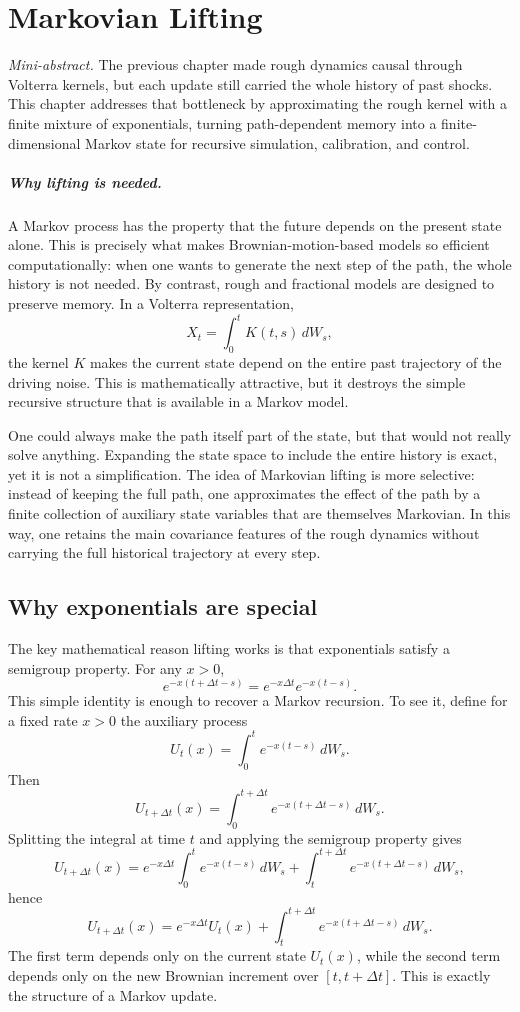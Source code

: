 \documentclass[a4paper,10pt,titlepage,oneside,openany]{book}
\theoremstyle{plain}
\theoremstyle{definition}
\theoremstyle{remark}
\newcommand{\miniabstract}[1]{%
\vspace{-2pt}
\begin{tcolorbox}[colback=gray!6,colframe=black!15,boxrule=0.3pt,arc=3pt,left=6pt,right=6pt,top=4pt,bottom=4pt]
\textit{Mini-abstract.} #1
\end{tcolorbox}
\vspace{-4pt}
}
\newcommand{\1}{\mathbf{1}}
\begin{document}
\chapter{Markovian Lifting}
\miniabstract{The previous chapter made rough dynamics causal through Volterra kernels, but each update still carried the whole history of past shocks. This chapter addresses that bottleneck by approximating the rough kernel with a finite mixture of exponentials, turning path-dependent memory into a finite-dimensional Markov state for recursive simulation, calibration, and control.}

\paragraph{Why lifting is needed.}

A Markov process has the property that the future depends on the present state alone. This is precisely what makes Brownian-motion-based models so efficient computationally: when one wants to generate the next step of the path, the whole history is not needed. By contrast, rough and fractional models are designed to preserve memory. In a Volterra representation,
\[
X_t=\int_0^t K(t,s)\,dW_s,
\]
the kernel \(K\) makes the current state depend on the entire past trajectory of the driving noise. This is mathematically attractive, but it destroys the simple recursive structure that is available in a Markov model.

One could always make the path itself part of the state, but that would not really solve anything. Expanding the state space to include the entire history is exact, yet it is not a simplification. The idea of Markovian lifting is more selective: instead of keeping the full path, one approximates the effect of the path by a finite collection of auxiliary state variables that are themselves Markovian. In this way, one retains the main covariance features of the rough dynamics without carrying the full historical trajectory at every step.

\section{Why exponentials are special}

The key mathematical reason lifting works is that exponentials satisfy a semigroup property. For any \(x>0\),
\[
e^{-x(t+\Delta t-s)} = e^{-x\Delta t}e^{-x(t-s)}.
\]
This simple identity is enough to recover a Markov recursion. To see it, define for a fixed rate \(x>0\) the auxiliary process
\[
U_t(x)=\int_0^t e^{-x(t-s)}\,dW_s.
\]
Then
\[
U_{t+\Delta t}(x)
=
\int_0^{t+\Delta t} e^{-x(t+\Delta t-s)}\,dW_s.
\]
Splitting the integral at time \(t\) and applying the semigroup property gives
\[
U_{t+\Delta t}(x)
=
e^{-x\Delta t}\int_0^t e^{-x(t-s)}\,dW_s
+
\int_t^{t+\Delta t} e^{-x(t+\Delta t-s)}\,dW_s,
\]
hence
\[
U_{t+\Delta t}(x)
=
e^{-x\Delta t}U_t(x)
+
\int_t^{t+\Delta t} e^{-x(t+\Delta t-s)}\,dW_s.
\]
The first term depends only on the current state \(U_t(x)\), while the second term depends only on the new Brownian increment over \([t,t+\Delta t]\). This is exactly the structure of a Markov update.
\end{document}
